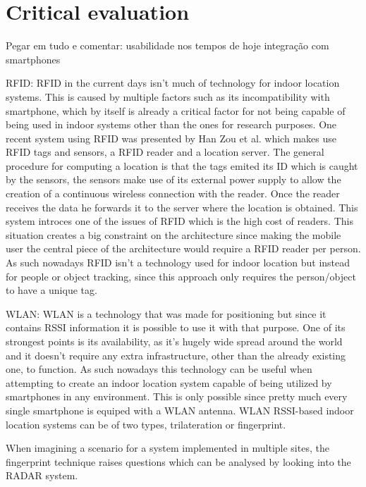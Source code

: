 \section{Critical evaluation}
\label{sec:critical}

Pegar em tudo e comentar:
	usabilidade nos tempos de hoje
	integração com smartphones


RFID:
	\acf{RFID} in the current days isn't much of technology for indoor location systems. This is caused by multiple factors such as its incompatibility with smartphone, which by itself is already a critical factor for not being capable of being used in indoor systems other than the ones for research purposes. One recent system using \ac{RFID} was presented by Han Zou et al. \cite{rfid_sys} which makes use RFID tags and sensors, a \ac{RFID} reader and a location server. The general procedure for computing a location is that the tags emited its ID which is caught by the sensors, the sensors make use of its external power supply to allow the creation of a continuous wireless connection with the reader. Once the reader receives the data he forwards it to the server where the location is obtained. This system introces one of the issues of RFID which is the high cost of readers. This situation creates a big constraint on the architecture since making the mobile user the central piece of the architecture would require a \ac{RFID} reader per person. As such nowadays \ac{RFID} isn't a technology used for indoor location but instead for people or object tracking, since this approach only requires the person/object to have a unique tag. 
	

WLAN:
	WLAN is a technology that was made for positioning but since it contains \acf{RSSI} information it is possible to use it with that purpose. One of its strongest points is its availability, as it's hugely wide spread around the world and it doesn't require any extra infrastructure, other than the already existing one, to function. As such nowadays this technology can be useful when attempting to create an indoor location system capable of being utilized by smartphones in any environment. This is only possible since pretty much every single smartphone is equiped with a WLAN antenna.
	WLAN \ac{RSSI}-based indoor location systems can be of two types, trilateration or fingerprint.

	When imagining a scenario for a system implemented in multiple sites, the fingerprint technique raises questions which can be analysed by looking into the RADAR system. 

